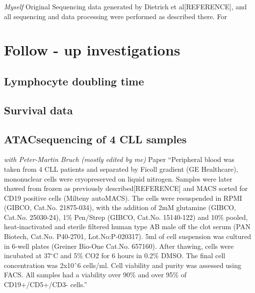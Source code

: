 \documentclass[11pt, a4paper, twosided]{book}
\begin{document}
\emph{Myself} Original
Sequencing data generated by Dietrich et al{[}REFERENCE{]}, and all sequencing and data processing were performed as described there. For

\hypertarget{follow---up-investigations}{%
\section{Follow - up investigations}\label{follow---up-investigations}}

\hypertarget{lymphocyte-doubling-time}{%
\subsection{Lymphocyte doubling time}\label{lymphocyte-doubling-time}}

\hypertarget{survival-data}{%
\subsection{Survival data}\label{survival-data}}

\hypertarget{atacsequencing-of-4-cll-samples}{%
\subsection{ATACsequencing of 4 CLL samples}\label{atacsequencing-of-4-cll-samples}}

\emph{with Peter-Martin Bruch (mostly edited by me)} Paper
``Peripheral blood was taken from 4 CLL patients and separated by Ficoll gradient (GE Healthcare), mononuclear cells were cryopreserved on liquid nitrogen. Samples were later thawed from frozen as previously described{[}REFERENCE{]} and MACS sorted for CD19 positive cells (Milteny autoMACS). The cells were resuspended in RPMI (GIBCO, Cat.No. 21875-034), with the addition of 2mM glutamine (GIBCO, Cat.No. 25030-24), 1\% Pen/Strep (GIBCO, Cat.No. 15140-122) and 10\% pooled, heat-inactivated and sterile filtered human type AB male off the clot serum (PAN Biotech, Cat.No. P40-2701, Lot.No:P-020317). 5ml of cell suspension was cultured in 6-well plates (Greiner Bio-One Cat.No. 657160). After thawing, cells were incubated at 37\(^\circ\)C and 5\% CO2 for 6 hours in 0.2\% DMSO. The final cell concentration was 2x10ˆ6 cells/ml. Cell viability and purity was assessed using FACS. All samples had a viability over 90\% and over 95\% of CD19+/CD5+/CD3- cells.''
\end{document}
